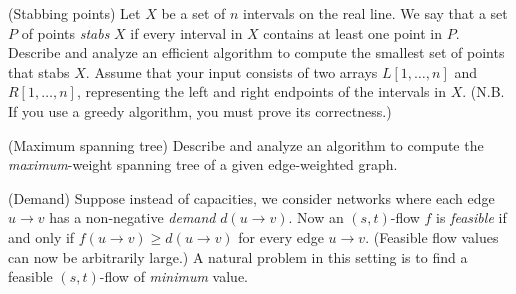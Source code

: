 \begin{questions}

\question[10] (Stabbing points) Let $X$ be a set of $n$ intervals on
  the real line. We say that a set $P$ of points \emph{stabs} $X$ if
  every interval in $X$ contains at least one point in $P$. Describe
  and analyze an efficient algorithm to compute the smallest set of
  points that stabs $X$. Assume that your input consists of two arrays
  $L[1,\ldots,n]$ and $R[1,\ldots,n]$, representing the left and right
  endpoints of the intervals in $X$. (N.B. If you use a greedy
  algorithm, you must prove its correctness.)
  \newpage

\question[10] (Maximum spanning tree) Describe and analyze an algorithm to
  compute the \emph{maximum}-weight spanning tree of a given
  edge-weighted graph. 

  \newpage
  

\question (Demand) Suppose instead of capacities, we consider networks
  where each edge $u\to v$ has a non-negative \emph{demand}
  $d(u\to v)$. Now an $(s,t)$-flow $f$ is \emph{feasible} if and only
  if $f(u\to v)\ge d(u\to v)$ for every edge $u\to v$. (Feasible flow
  values can now be arbitrarily large.) A natural problem in this
  setting is to find a feasible $(s,t)$-flow of \emph{minimum} value.


\end{questions}

